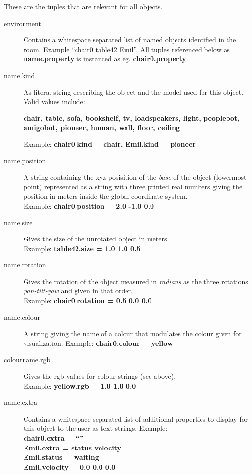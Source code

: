 \documentclass{article}
\newcommand{\tn}{\bf}
\begin{document}
These are the tuples that are relevant for all objects.
\begin{description}
\item[environment] Contains a whitespace separated list of named objects identified in the room. Example ``chair0 table42 Emil''. All tuples
referenced below as {\tn name.property} is instanced as eg. {\tn chair0.property}.
\item[name.kind] As literal string describing the object and the model used for this object. Valid values include:
\begin{center} \tn chair, table, sofa, bookshelf, tv, loadspeakers, light, peoplebot, amigobot, pioneer, human, wall, floor, ceiling \end{center}
Example: {\tn chair0.kind = chair, Emil.kind = pioneer}
\item[name.position] A string containing the xyz posisition of the {\em base} of the object (lowermost point) represented as a string with three
printed real numbers giving the position in meters inside the global coordinate system. \\ Example: {\tn chair0.position = 2.0 -1.0 0.0}
\item[name.size] Gives the size of the unrotated object in meters. \\ Example: {\tn table42.size = 1.0 1.0 0.5}
\item[name.rotation] Gives the rotation of the object measured in {\em radians} as the three rotations {\em pan-tilt-yaw} and given in that order. \\
Example: {\tn chair0.rotation = 0.5 0.0 0.0}
\item[name.colour] A string giving the name of a colour that modulates the colour given for visualization. 
Example: {\tn chair0.colour = yellow}
\item[colourname.rgb] Gives the rgb values for colour strings (see above). \\ Example: {\tn yellow.rgb = 1.0 1.0 0.0}
\item[name.extra] Contains a whitespace separated list of additional properties to display for this object to the user as text strings. 
Example: {\tn \\ chair0.extra = ``'' \\ Emil.extra = status velocity \\ Emil.status = waiting \\ Emil.velocity = 0.0 0.0 0.0}

\end{description}
\end{document}
